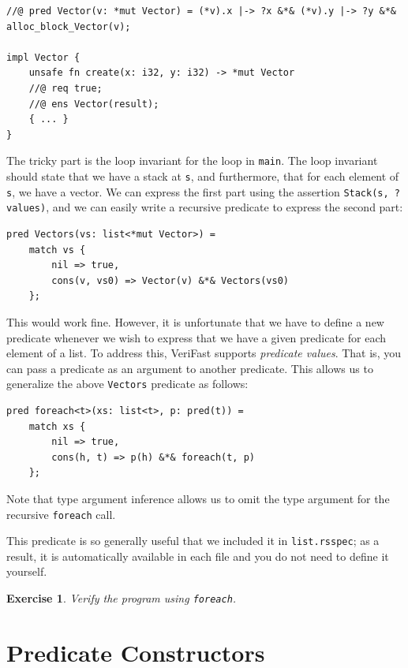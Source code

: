\documentclass{article}
\newtheorem{exercise}{Exercise}
\begin{document}
\begin{lstlisting}
//@ pred Vector(v: *mut Vector) = (*v).x |-> ?x &*& (*v).y |-> ?y &*& alloc_block_Vector(v);

impl Vector {
    unsafe fn create(x: i32, y: i32) -> *mut Vector
    //@ req true;
    //@ ens Vector(result);
    { ... }
}
\end{lstlisting}

The tricky part is the loop invariant for the loop in
\lstinline!main!. The loop invariant should state that we have
a stack at \lstinline!s!, and furthermore, that for each
element of \lstinline!s!, we have a vector. We can express the
first part using the assertion \lstinline!Stack(s, ?values)!,
and we can easily write a recursive predicate to express the
second part:

\begin{lstlisting}
pred Vectors(vs: list<*mut Vector>) =
    match vs {
        nil => true,
        cons(v, vs0) => Vector(v) &*& Vectors(vs0)
    };
\end{lstlisting}

This would work fine. However, it is unfortunate that we have
to define a new predicate whenever we wish to express that we
have a given predicate for each element of a list. To address
this, VeriFast supports \emph{predicate values}. That is, you
can pass a predicate as an argument to another predicate. This
allows us to generalize the above \lstinline!Vectors! predicate
as follows:

\begin{lstlisting}
pred foreach<t>(xs: list<t>, p: pred(t)) =
    match xs {
        nil => true,
        cons(h, t) => p(h) &*& foreach(t, p)
    };
\end{lstlisting}

Note that type argument inference allows us to omit the type
argument for the recursive \lstinline!foreach! call.

This predicate is so generally useful that we included it in
\texttt{list.rsspec}; as a result, it is automatically available in
each file and you do not need to define it yourself.

\begin{exercise}\label{exercise:foreach}
Verify the program using \lstinline!foreach!.
\end{exercise}

\section{Predicate Constructors}\label{section:predctors}
\end{document}
